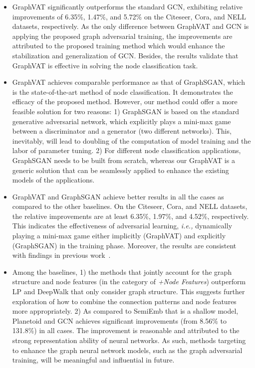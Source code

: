 \documentclass[10pt,journal,compsoc]{IEEEtran}
\newcommand{\ie}{\emph{i.e., }}
\begin{document}
\begin{itemize}[leftmargin=*]
	\item GraphVAT significantly outperforms the standard GCN, exhibiting relative improvements of 6.35\%, 1.47\%, and 5.72\% on the Citeseer, Cora, and NELL datasets, respectively. As the only difference between GraphVAT and GCN is applying the proposed graph adversarial training, the improvements are attributed to the proposed training method which would enhance the stabilization and generalization of GCN. Besides, the results validate that GraphVAT is effective in solving the node classification task.
\item GraphVAT achieves comparable performance as that of GraphSGAN, which is the state-of-the-art method of node classification. It demonstrates the efficacy of the proposed method. However, our method could offer a more feasible solution for two reasons: 1) GraphSGAN is based on the standard generative adversarial network, which explicitly plays a mini-max game between a discriminator and a generator (two different networks). This, inevitably, will lead to doubling of the computation of model training and the labor of parameter tuning. 2) For different node classification applications, GraphSGAN needs to be built from scratch, whereas our GraphVAT is a generic solution that can be seamlessly applied to enhance the existing models of the applications.
	\item GraphVAT and GraphSGAN achieve better results in all the cases as compared to the other baselines. On the Citeseer, Cora, and NELL datasets, the relative improvements are at least 6.35\%, 1.97\%, and 4.52\%, respectively. This indicates the effectiveness of adversarial learning, \ie dynamically playing a mini-max game either implicitly (GraphVAT) and explicitly (GraphSGAN) in the training phase. Moreover, the results are consistent with findings in previous work~\cite{goodfellow2015explaining,yu2018learning,he2018adversarial,miyato2018virtual}.
	\item Among the baselines, 1) the methods that jointly account for the graph structure and node features (in the category of \textit{+Node Features}) outperform LP and DeepWalk that only consider graph structure. This suggests further exploration of how to combine the connection patterns and node features more appropriately. 2) As compared to SemiEmb that is a shallow model, Planetoid and GCN achieves significant improvements (from 8.56\% to 131.8\%) in all cases. The improvement is reasonable and attributed to the strong representation ability of neural networks. As such, methods targeting to enhance the graph neural network models, such as the graph adversarial training, will be meaningful and influential in future.
\end{itemize}
\end{document}
